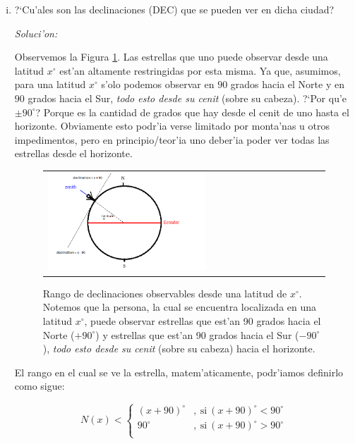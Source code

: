 \documentclass{article}
\newenvironment{myfont}{\fontfamily{pnc}\selectfont}{\par}
\begin{document}
\begin{enumerate}[a)]
\begin{enumerate} [i)]

\begin{myfont}
\item ?`Cu'ales son las declinaciones (DEC) que se pueden ver en dicha ciudad?
\end{myfont}

\emph{Soluci'on:}

Observemos la Figura \ref{observable}. Las estrellas que uno puede observar desde una latitud $x^\circ$ est'an altamente restringidas por esta misma. Ya que, asumimos, para una latitud $x^\circ$ s'olo podemos observar en $90$ grados hacia el Norte y en $90$ grados hacia el Sur, \emph{todo esto desde su cenit} (sobre su cabeza). ?`Por qu'e $\pm 90^\circ$? Porque es la cantidad de grados que hay desde el cenit de uno hasta el horizonte. Obviamente esto podr'ia verse limitado por monta'nas u otros impedimentos, pero en principio/teor'ia uno deber'ia poder ver todas las estrellas desde el horizonte.

\begin{figure}[!ht]
\begin{center}
\begin{tabular}{ll}
  \includegraphics[width=0.6\textwidth]{observable.png} 
\end{tabular}
\caption{{\small Rango de declinaciones observables desde una latitud de $x^\circ$. Notemos que la persona, la cual se encuentra localizada en una latitud $x^\circ$, puede observar estrellas que est'an 90 grados hacia el Norte ($+90^\circ$) y estrellas que est'an 90 grados hacia el Sur ($-90^\circ$), \emph{todo esto desde su cenit} (sobre su cabeza) hacia el horizonte.}}\label{observable}
\end{center} 
\end{figure}

El rango en el cual se ve la estrella, matem'aticamente, podr'iamos definirlo como sigue:

\[ N(x) < \begin{cases} 
      (x+90)^\circ & , \ \text{si} \  (x+90)^\circ < 90^\circ \\
      90^\circ & , \ \text{si} \  (x+90)^\circ > 90^\circ \\
   \end{cases}
\]


\end{enumerate}
\end{enumerate}
\end{document}
